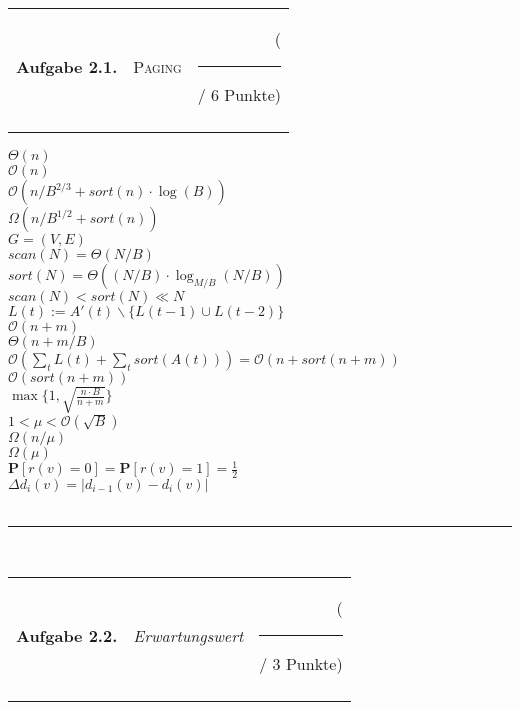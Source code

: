\documentclass[12pt,a4paper,titlepage,xcolor=dvipsnames]{article}
\begin{document}
\label{Aufgabe 1}
\noindent
\begin{tabulary}{17cm}{LLR}
\textbf{Aufgabe 2.1.} &\textsc{Paging}& ( \rule[-2mm]{5mm}{0.2mm} / 6 Punkte)\\
\hspace{2.8cm} &\hspace{10cm} &\hspace{4cm} 
\end{tabulary}
\noindent

$\Theta(n)$\\
$\mathcal{O}(n)$\\
$\mathcal{O}(n/B^{2/3}+sort(n)\cdot \log (B))$\\
$\Omega(n/B^{1/2}+sort(n))$\\
$G=(V,E)$\\
$scan(N)=\Theta(N/B)$\\
$sort(N)=\Theta((N/B)\cdot \log_{M/B}(N/B))$\\
$scan(N)<sort(N)\ll N$\\
$L(t):=A'(t)\backslash \{L(t-1)\cup L(t-2)\}$\\
$\mathcal{O}(n+m)$\\
$\Theta(n+m/B)$\\
$\mathcal{O}(\sum_t L(t)+\sum_t sort(A(t)))=\mathcal{O}(n+sort(n+m))$\\
$\mathcal{O}(sort(n+m))$\\
$\max\{1,\sqrt{\frac{n\cdot B}{n+m}}\}$\\
$1<\mu < \mathcal{O}(\sqrt{B})$\\
$\Omega(n/\mu)$\\
$\Omega(\mu)$\\
$\textbf{P}[r(v)=0]=\textbf{P}[r(v)=1]=\frac{1}{2}$\\
$\Delta d_i(v)=|d_{i-1}(v)-d_i(v)|$\\

\\
\vspace*{.2cm}
\noindent\rule{\textwidth}{1pt}
\\
\label{Aufgabe 2}
\noindent
\begin{tabulary}{17cm}{LLR}
\textbf{Aufgabe 2.2.} &\textit{Erwartungswert}& ( \rule[-2mm]{5mm}{0.2mm} / 3 Punkte)\\
\hspace{2.8cm} &\hspace{10cm} &\hspace{4cm} 
\end{tabulary}
\noindent
\end{document}
